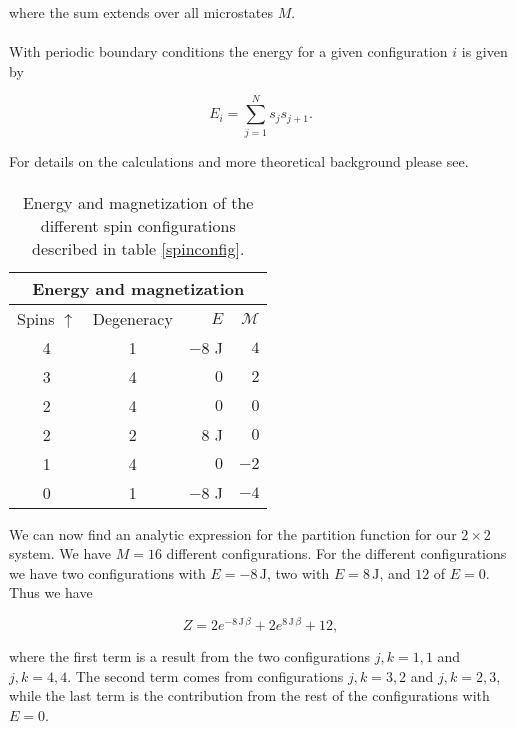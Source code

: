 \documentclass[a4paper, fontsize=11pt]{article}
\begin{document}
where the sum extends over all microstates $M$. 

\paragraph{}
With periodic boundary conditions the energy for a given configuration $i$ is given by

\begin{equation}
E_{i} = \sum^N_{j=1} s_{j} s_{j+1}. 
\end{equation}

For details on the calculations and more theoretical background please see. \cite{H-Jensen}

\paragraph{}

\begin{table}[h!]
\centering
\begin{tabular}{|c||c|r|r|}
\toprule
\multicolumn{4}{c}{Energy and magnetization}
\\ \hline
Spins $\uparrow$ & Degeneracy & $E$ & $\mathcal{M}$
\tabularnewline
\hline
4 & 1 & $-8$ J & $4$
\tabularnewline \hline
3 & 4 & $0$ & $2$
\tabularnewline \hline
2 & 4 & $0$  & $0$
\tabularnewline \hline
2 & 2 & $8$ J & $0$
\tabularnewline \hline
1 & 4 & $0$  & $-2$
\tabularnewline \hline
0 & 1 & $-8$ J & $-4$
\tabularnewline \hline
\end{tabular}
\caption{Energy and magnetization of the different spin configurations described in table \ref{spinconfig}.}
\label{EM}
\end{table}

We can now find an analytic expression for the partition function for our $2 \times 2$ system. We have $M = 16$ different configurations. For the different configurations we have two configurations with $E = -8 \, \text{J}$, two with $E = 8 \, \text{J}$, and $12$ of $E=0$. Thus we have

\begin{equation}
Z = 2 e^{-8\, \text{J} \, \beta} + 2 e^{8 \,\text{J} \, \beta} + 12,
\end{equation}

where the first term is a result from the two configurations $j,k=1,1$ and $j,k = 4,4$. The second term comes from configurations $j,k = 3,2$ and $j,k = 2,3$, while the last term is the contribution from the rest of the configurations with $E=0$.
\end{document}
